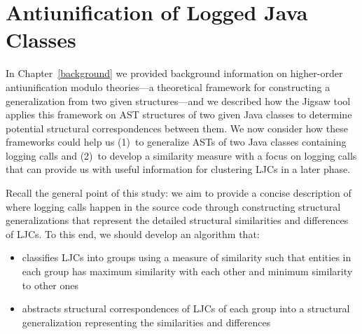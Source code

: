 
\chapter{Antiunification of Logged Java Classes} \label{ch4} \label{methodology}
In Chapter~\ref{background} we provided background information on higher-order antiunification modulo theories---a theoretical framework for constructing a generalization from two given structures---and we described how the Jigsaw tool applies this framework on AST structures of two given Java classes to determine potential structural correspondences between them. We now consider how these frameworks could help us (1)~to generalize ASTs of two Java classes containing logging calls and (2)~to develop a similarity measure with a focus on logging calls that can provide us with useful information for clustering LJCs in a later phase.

Recall the general point of this study: we aim to provide a concise description of where logging calls happen in the source code through constructing structural generalizations that represent the detailed structural similarities and differences of LJCs. To this end, we should develop an algorithm that:
\begin{itemize} [leftmargin=.3in]
\item classifies LJCs into groups using a measure of similarity such that entities in each group has maximum similarity with each other and minimum similarity to other ones
\item abstracts structural correspondences of LJCs of each group into a structural generalization representing the similarities and differences
\end{itemize}

